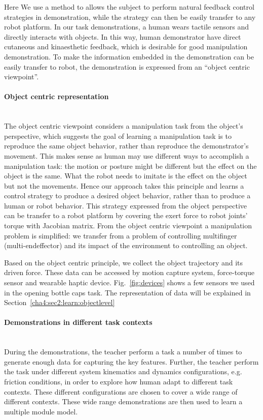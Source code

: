 Here We use a method to allows the subject to perform natural feedback control strategies in demonstration, while the strategy can then be easily transfer to any robot platform. In our task demonstrations, a human wears tactile sensors and directly interacts with objects. In this way, human demonstrator have direct cutaneous and kinaesthetic feedback, which is desirable for good manipulation demonstration. To make the information embedded in the demonstration can be easily transfer to robot, the demonstration is expressed from an ``object centric viewpoint''.


\paragraph{Object centric representation} ~\\
The object centric viewpoint considers a manipulation task from the object's perspective, which suggests the goal of learning a manipulation task is to reproduce the same object behavior, rather than reproduce the demonstrator's movement. This makes sense as human may use different ways to accomplish a manipulation task: the motion or posture might be different but the effect on the object is the same. What the robot needs to imitate is the effect on the object but not the movements.
Hence our approach takes this principle and learns a control strategy to produce a desired object behavior, rather than to produce a human or robot behavior. This strategy expressed from the object perspective can be transfer to a robot platform by covering the exert force to robot joints' torque with Jacobian matrix. From the object centric viewpoint a manipulation problem is simplified: we transfer from a problem of controlling multifinger (multi-endeffector) and its impact of the environment to controlling an object.

Based on the object centric principle, we collect the object trajectory and its driven force. These data can be accessed by motion capture system, force-torque sensor and wearable haptic device. Fig.~\ref{fig:devices} shows a few sensors we used in the opening bottle caps task. The representation of data will be explained in Section~\ref{cha4:sec2:learn:objectlevel}


\paragraph{Demonstrations in different task contexts}  ~\\
During the demonstrations, the teacher perform a task a number of times to generate enough data for capturing the key features. Further, the teacher perform the task under different system kinematics and dynamics configurations, e.g. friction conditions, in order to explore how human adapt to different task contexts. These different configurations are chosen to cover a wide range of different contexts. These wide range demonstrations are then used to learn a multiple module model.





